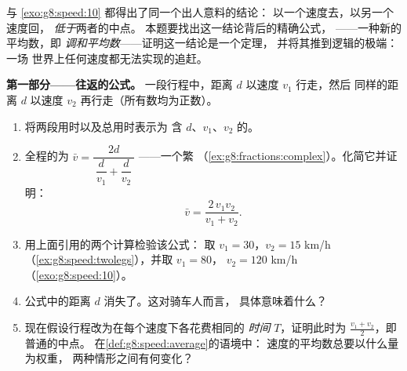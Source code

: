 \begin{problem}
\label{pb:g8:speed:1}
 与 \cref{exo:g8:speed:10} 都得出了同一个出人意料的结论：
以一个速度去，以另一个速度回，
\emph{低于}两者的中点。
本题要找出这一结论背后的精确公式，
——一种新的平均数，即
\emph{调和平均数}——证明这一结论是一个定理，
并将其推到逻辑的极端：一场
世界上任何速度都无法实现的追赶。

\medskip
\noindent\textbf{第一部分——往返的公式。}
一段行程中，距离 $d$ 以速度 $v_1$ 行走，然后
同样的距离 $d$ 以速度 $v_2$ 再行走（所有数均为正数）。
\begin{enumerate}
  \item 将两段用时以及总用时表示为
        含 $d$、$v_1$、$v_2$ 的。
  \item 全程的为
        $\bar v = \dfrac{2d}{\ \dfrac{d}{v_1} + \dfrac{d}{v_2}\ }$
——一个繁
        （\cref{ex:g8:fractions:complex}）。化简它并证明：
        \[
        \bar v = \frac{2\, v_1 v_2}{v_1 + v_2} .
        \]
  \item 用上面引用的两个计算检验该公式：
        取 $v_1 = 30$，$v_2 = 15$ km/h
        （\cref{ex:g8:speed:twolegs}），并取 $v_1 = 80$，
        $v_2 = 120$ km/h（\cref{exo:g8:speed:10}）。
  \item 公式中的距离 $d$ 消失了。这对骑车人而言，
        具体意味着什么？
  \item 现在假设行程改为在每个速度下各花费相同的
        \emph{时间} $T$，证明此时为
        $\frac{v_1 + v_2}{2}$，即普通的中点。
        在\cref{def:g8:speed:average}的语境中：
        速度的平均数总要以什么量为权重，
        两种情形之间有何变化？
\end{enumerate}


\end{problem}
